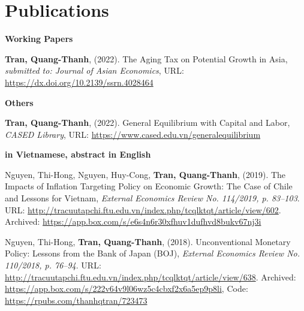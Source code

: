 
\section{\sc Publications}
{\bf Working Papers}
\vspace*{.05in}
\begin{etaremune}[]
\item
  {\bf Tran, Quang-Thanh},
  (2022).
  {The Aging Tax on Potential Growth in Asia},
  {\it submitted to: Journal of Asian Economics},
  {URL: \url{https://dx.doi.org/10.2139/ssrn.4028464}}
\end{etaremune}

{\bf Others}
\vspace*{.05in}
\vspace*{.05in}
\begin{etaremune}[]
\item
  {\bf Tran, Quang-Thanh},
  (2022).
  {General Equilibrium with Capital and Labor},
  {\it CASED Library},
  {URL: \url{https://www.cased.edu.vn/generalequilibrium}}
\end{etaremune}

{\bf in Vietnamese, abstract in English}
\vspace*{.05in}
\begin{etaremune}[]
	\item
	Nguyen, Thi-Hong,
	Nguyen, Huy-Cong,
	{\bf Tran, Quang-Thanh},
	(2019).
	{The Impacts of Inflation Targeting Policy on Economic Growth: The Case of Chile and Lessons for Vietnam},
	{\it External Economics Review No. 114/2019, p. 83--103}.
	{URL: \url{http://tracuutapchi.ftu.edu.vn/index.php/tcqlktqt/article/view/602}}. 
	{Archived: \url{https://app.box.com/s/e6s4n6r30xfhuv1dufhvd8bukv67nj3i}}

	\item 
	Nguyen, Thi-Hong,
	{\bf Tran, Quang-Thanh},
	(2018).
	Unconventional Monetary Policy: Lessons from the Bank of Japan (BOJ),
	{\it External Economics Review No. 110/2018, p. 76--94}.
	{URL: \url{http://tracuutapchi.ftu.edu.vn/index.php/tcqlktqt/article/view/638}}.
	{Archived: \url{https://app.box.com/s/222v64v9l06wz5c4cbxf2x6a5ep9p8li}, Code: \url{https://rpubs.com/thanhqtran/723473}}
\end{etaremune}


